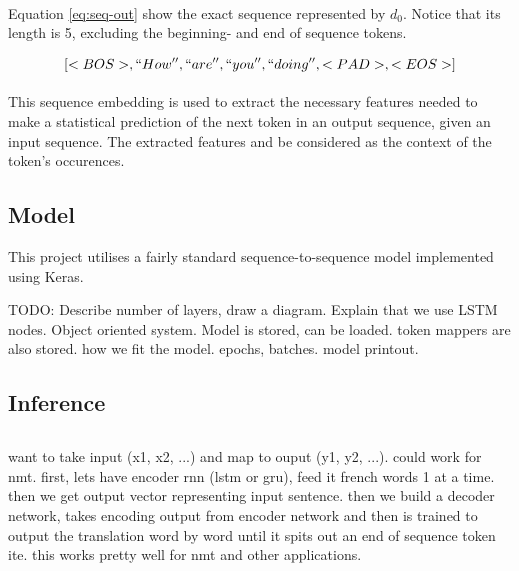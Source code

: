 \documentclass{article}
\begin{document}
\paragraph{}
Equation \ref{eq:seq-out} show the exact sequence represented by $d_0$. Notice
that its length is 5, excluding the beginning- and end of sequence tokens.

\begin{equation} \label{eq:seq-out}
[<BOS>, ``How'', ``are'', ``you'', ``doing'', <PAD>, <EOS>]
\end{equation}

\paragraph{}
This sequence embedding is used to extract the necessary features needed to
make a statistical prediction of the next token in an output sequence, given an
input sequence. The extracted features and be considered as the context of the
token's occurences.


\subsection{Model}

This project utilises a fairly standard sequence-to-sequence model implemented
using Keras.

TODO: Describe number of layers, draw a diagram. Explain that we use LSTM nodes.
Object oriented system. Model is stored, can be loaded. token mappers are also
stored. how we fit the model. epochs, batches. model printout.

\subsection{Inference}

\subsection{}

want to take input (x1, x2, ...) and map to ouput (y1, y2, ...). could work for nmt. first, lets have encoder rnn (lstm or gru),
feed it french words 1 at a time. then we get output vector representing input sentence. then we build a decoder network,
takes encoding output from encoder network and then is trained to output the translation word by word until it spits out an end of sequence token
 ite. this works pretty well for nmt and other applications. 
\end{document}
